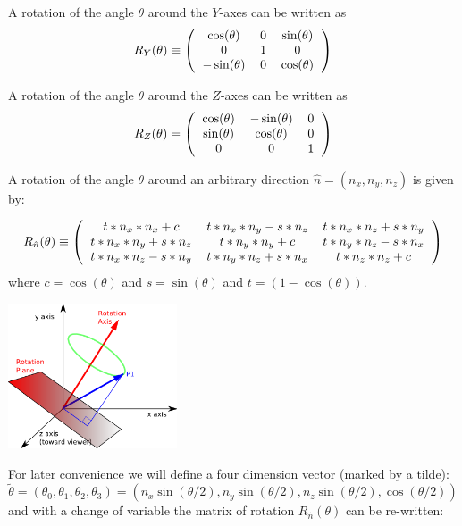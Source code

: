 \documentclass[12pt]{article}
\begin{document}
A rotation of the angle $\theta$ around the $Y$-axes can be written as
\begin{equation}
R_Y(\theta) \equiv \left(\begin{tabular}{ccc}
$\cos(\theta)$ & 0 & $\sin(\theta)$ \\
0 & 1 & 0 \\
$-\sin(\theta)$ & 0 & $\cos(\theta)$ 
\end{tabular}\right)
\end{equation}

A rotation of the angle $\theta$ around the $Z$-axes can be written as
\begin{equation}
R_Z(\theta) = \left(\begin{tabular}{ccc}
$\cos(\theta)$ & $-\sin(\theta)$ & 0 \\
$\sin(\theta)$ & $\cos(\theta)$ & 0 \\
0 & 0 & 1
\end{tabular}\right)
\end{equation}

A rotation of the angle $\theta$ around an arbitrary direction $\hat n = (n_x,n_y,n_z)$ is given by:

\begin{equation}
R_{\hat n}(\theta) \equiv \left(\begin{tabular}{ccc} 
$t*n_x*n_x+c$ & $t*n_x*n_y-s*n_z$ & $t*n_x*n_z+s*n_y$ \\
$t*n_x*n_y+s*n_z$ & $t*n_y*n_y+c$ & $t*n_y*n_z-s*n_x$ \\
$t*n_x*n_z-s*n_y$ & $t*n_y*n_z+s*n_x$ & $t*n_z*n_z+c$
\end{tabular}\right)
\end{equation}
where $c=\cos(\theta)$ and $s=\sin(\theta)$ and $t=(1-\cos(\theta))$.

\begin{center}
\includegraphics[width=5cm]{images/rotation.png}
\end{center}

For later convenience we will define a four dimension vector (marked by a tilde):
\begin{equation}
\tilde \theta = (\theta_0,\theta_1,\theta_2,\theta_3) = (n_x \sin(\theta/2), n_y \sin(\theta/2), n_z \sin(\theta/2),\cos(\theta/2))
\label{quaternion}
\end{equation}
and with a change of variable the matrix of rotation $R_{\hat n}(\theta)$ can be re-written:
\end{document}
